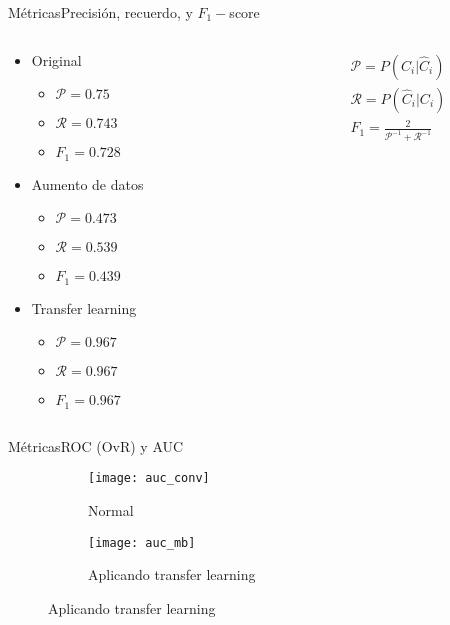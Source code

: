 \documentclass[aspectratio = 169]{beamer}
\begin{document}
			\begin{frame}{Métricas}{Precisión, recuerdo, y $F_1-$score}
				\begin{columns}
					\begin{column}{.6\textwidth}
						\begin{block}{}
							\begin{itemize}
								\item Original
								\begin{itemize}
									\item $\mathcal{P} = 0.75$
									\item $\mathcal{R} = 0.743$
									\item $F_1 = 0.728$
								\end{itemize}
								\item Aumento de datos
								\begin{itemize}
									\item $\mathcal{P} = 0.473$
									\item $\mathcal{R} = 0.539$
									\item $F_1 = 0.439$
								\end{itemize}
								\item Transfer learning
								\begin{itemize}
									\item $\mathcal{P} = 0.967$
									\item $\mathcal{R} = 0.967$
									\item $F_1 = 0.967$
								\end{itemize}
							\end{itemize}
						\end{block}
					\end{column}
					\begin{column}{.4\textwidth}
						$$
						\begin{gathered}
							\mathcal{P} = P(C_i | \hat{C}_i)\\
							\mathcal{R} = P(\hat{C}_i | C_i)\\
							F_1 = \frac{2}{\mathcal{P}^{-1} + \mathcal{R}^{-1}}
						\end{gathered}
						$$
					\end{column}
				\end{columns}
			\end{frame}
			\begin{frame}{Métricas}{ROC (OvR) y AUC}
				\begin{figure}
					\centering
					\begin{subfigure}{.4\textwidth}
						\centering
						\texttt{[image: auc\_conv]}
						\caption{Normal}
						\label{fig:roc_conv}
					\end{subfigure}\hfill
					\begin{subfigure}{.4\textwidth}
						\centering
						\texttt{[image: auc\_mb]}
						\caption{Aplicando transfer learning}
						\label{fig:roc_mb}
					\end{subfigure}
					\label{fig:roc}
				\end{figure}
			\end{frame}
\end{document}
